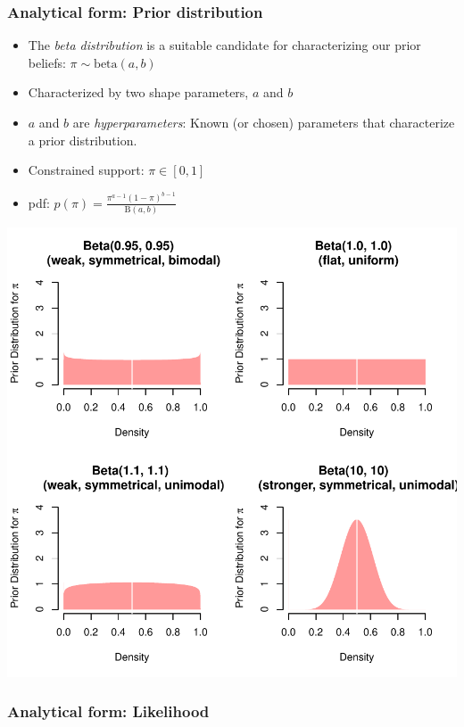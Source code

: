 \documentclass[
  11pt,
]{article}
\providecommand{\tightlist}{%
  \setlength{\itemsep}{0pt}\setlength{\parskip}{0pt}}
\begin{document}
\hypertarget{analytical-form-prior-distribution}{%
\subsubsection{Analytical form: Prior distribution}\label{analytical-form-prior-distribution}}

\begin{itemize}
\tightlist
\item
  The \emph{beta distribution} is a suitable candidate for characterizing our prior beliefs: \(\pi \sim \text{beta}(a,b)\)
\item
  Characterized by two shape parameters, \(a\) and \(b\)
\item
  \(a\) and \(b\) are \emph{hyperparameters}: Known (or chosen) parameters that characterize a prior distribution.
\item
  Constrained support: \(\pi \in [0, 1]\)
\item
  pdf: \(p(\pi) = \frac{\pi^{a-1} (1- \pi)^{b-1}}{\text{B}(a, b)}\)
\end{itemize}

\begin{center}\includegraphics{03-lec_files/figure-latex/beta-1} \end{center}

\hypertarget{analytical-form-likelihood}{%
\subsubsection{Analytical form: Likelihood}\label{analytical-form-likelihood}}
\end{document}
